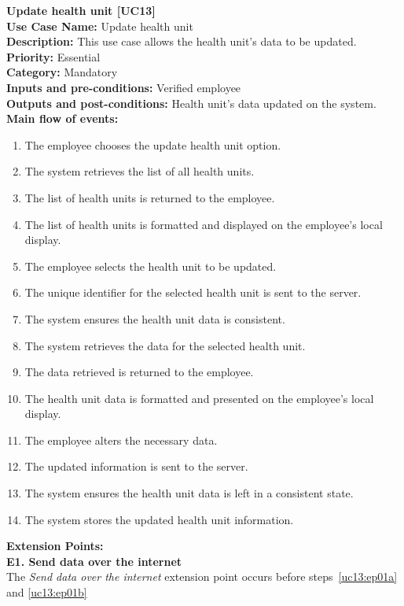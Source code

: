 \documentclass[11pt,twoside]{article}
\begin{document}
\textbf{Update health unit [UC13]}\\
\textbf{Use Case Name:} Update health unit \\
\textbf{Description:} This use case allows the health unit's data to be updated.\\
\textbf{Priority:} Essential \\
\textbf{Category:} Mandatory \\
\textbf{Inputs and pre-conditions:} Verified employee \\
\textbf{Outputs and post-conditions:} Health unit's data updated on the system.\\
\textbf{Main flow of events:}\\
\begin{enumerate}
\item The employee chooses the update health unit option.
\item The system retrieves the list of all health units.
\item The list of health units is returned to the employee.
\item The list of health units is formatted and displayed on the employee's local
display.
\item  The employee selects the health unit to be updated.
\item  \label{uc13:ep01a}The unique identifier for the selected health unit is sent to the server.
\item  The system ensures the health unit data is consistent.
\item  The system retrieves the data for the selected health unit.
\item  The data retrieved is returned to the employee.
\item  The health unit data is formatted and presented on the employee's local
display.
\item  The employee alters the necessary data.
\item  \label{uc13:ep01b}The updated information is sent to the server.
\item  The system ensures the health unit data is left in a consistent state.
\item  The system stores the updated health unit information.
\end{enumerate}

\textbf{Extension Points:}\\
\textbf{E1. Send data over the internet}\\
The \textit{Send data over the internet} extension point occurs before steps~\ref{uc13:ep01a} and \ref{uc13:ep01b}
\end{document}

